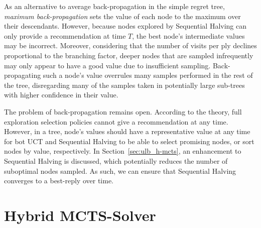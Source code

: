 \documentclass{kecsmstr}
\begin{document}
As an alternative to average back-propagation in the simple regret tree, \emph{maximum back-propagation} sets the value of each node to the maximum over their descendants. However, because nodes explored by Sequential Halving can only provide a recommendation at time $T$, the best node's intermediate values may be incorrect. Moreover, considering that the number of visits per ply declines proportional to the branching factor, deeper nodes that are sampled infrequently may only appear to have a good value due to insufficient sampling. Back-propagating such a node's value overrules many samples performed in the rest of the tree, disregarding many of the samples taken in potentially large sub-trees with higher confidence in their value.

The problem of back-propagation remains open. According to the theory, full exploration selection policies cannot give a recommendation at any time. However, in a tree, node's values should have a representative value at any time for bot UCT and Sequential Halving to be able to select promising nodes, or sort nodes by value, respectively. In Section~\ref{sec:ulb_h-mcts}, an enhancement to Sequential Halving is discussed, which potentially reduces the number of suboptimal nodes sampled. As such, we can ensure that Sequential Halving converges to a best-reply over time.

\newpage
\section{Hybrid MCTS-Solver}
\label{sec:hybmctssolver}
\end{document}
